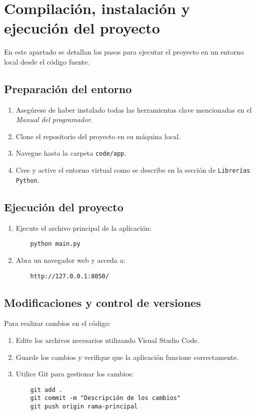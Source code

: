\section{Compilación, instalación y ejecución del proyecto}

En este apartado se detallan los pasos para ejecutar el proyecto en un entorno local desde el código fuente.

\subsection{Preparación del entorno}
\begin{enumerate}
    \item Asegúrese de haber instalado todas las herramientas clave mencionadas en el \textit{Manual del programador}.
    \item Clone el repositorio del proyecto en su máquina local.
    \item Navegue hasta la carpeta \texttt{code/app}.
    \item Cree y active el entorno virtual como se describe en la sección de \texttt{Librerías Python}.
\end{enumerate}

\subsection{Ejecución del proyecto}
\begin{enumerate}
    \item Ejecute el archivo principal de la aplicación:
    \begin{verbatim}
    python main.py
    \end{verbatim}
    \item Abra un navegador web y acceda a:
    \begin{verbatim}
    http://127.0.0.1:8050/
    \end{verbatim}
\end{enumerate}

\subsection{Modificaciones y control de versiones}
Para realizar cambios en el código:
\begin{enumerate}
    \item Edite los archivos necesarios utilizando Visual Studio Code.
    \item Guarde los cambios y verifique que la aplicación funcione correctamente.
    \item Utilice Git para gestionar los cambios:
    \begin{verbatim}
    git add .
    git commit -m "Descripción de los cambios"
    git push origin rama-principal
    \end{verbatim}
\end{enumerate}

